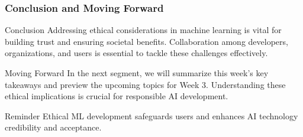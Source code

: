 \documentclass[aspectratio=169]{beamer}
\begin{document}
\begin{frame}[fragile]
    \frametitle{Conclusion and Moving Forward}
    \begin{block}{Conclusion}
        Addressing ethical considerations in machine learning is vital for building trust and ensuring societal benefits. Collaboration among developers, organizations, and users is essential to tackle these challenges effectively.
    \end{block}

    \begin{block}{Moving Forward}
        In the next segment, we will summarize this week's key takeaways and preview the upcoming topics for Week 3. Understanding these ethical implications is crucial for responsible AI development.
    \end{block}
    
    \begin{alertblock}{Reminder}
        Ethical ML development safeguards users and enhances AI technology credibility and acceptance.
    \end{alertblock}
\end{frame}
\end{document}
